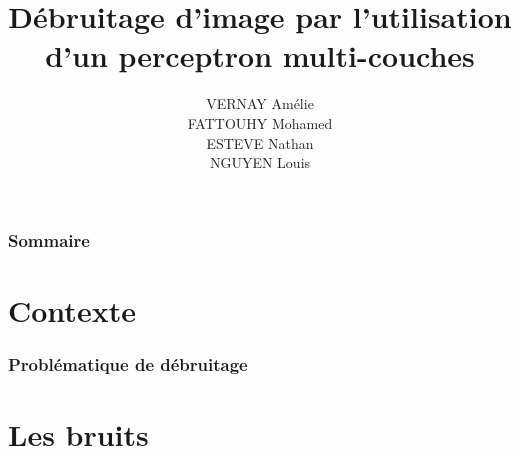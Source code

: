 \documentclass[8pt]{beamer}
\title{Débruitage d'image par l'utilisation d'un perceptron multi-couches}
\author{VERNAY Amélie \\ FATTOUHY Mohamed \\ ESTEVE Nathan \\ NGUYEN Louis}
\begin{document}
\begin{frame}
\titlepage
\end{frame}


\begin{frame}
\frametitle{Sommaire}
\tableofcontents
\end{frame}


\section{Contexte}

\begin{frame}
\frametitle{Problématique de débruitage}
\end{frame}


\section{Les bruits}

\begin{frame}
\end{frame}
\end{document}
